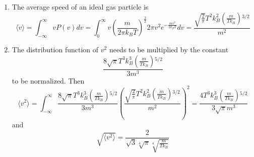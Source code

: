 \documentclass[fleqn]{article}[12pt]
\begin{document}
\begin{enumerate}
\begin{enumerate}
        \item
        The average speed of an ideal gas particle is
        \begin{equation*}
            \langle v \rangle = \int_{-\infty}^{\infty} v P(v) dv =
            \int_{0}^{\infty} v \left(\frac{m}{2\pi k_B T}\right)^{\frac{3}{2}} 2 \pi v^2 e^{-\frac{mv^2}{2k_BT}} dv =
            \frac{\sqrt{\frac{2}{\pi }} T^2 k_B^2 \left(\frac{m}{T k_B}\right){}^{3/2}}{m^2}
        \end{equation*}

        \item The distribution function of $v^2$ needs to be multiplied by the constant
        \begin{equation*}
            \frac{8 \sqrt{\pi } T^3 k_B^3 \left(\frac{m}{T k_B}\right){}^{5/2}}{3 m^3}
        \end{equation*}
        to be normalized. Then
        \begin{equation*}
            \langle v^2 \rangle = \int_{-\infty}^{\infty} \frac{8 \sqrt{\pi } T^3 k_B^3 \left(\frac{m}{T k_B}\right){}^{5/2}}{3 m^3} \left(\frac{\sqrt{\frac{2}{\pi }} T^2 k_B^2 \left(\frac{m}{T k_B}\right){}^{3/2}}{m^2}\right)^2 =
            \frac{4 T^3 k_B^3 \left(\frac{m}{T k_B}\right){}^{5/2}}{3 \sqrt{\pi } m^3}
        \end{equation*}
        and
        \begin{equation*}
            \sqrt{\langle v^2 \rangle} = \frac{2}{\sqrt{3} \sqrt[4]{\pi } \sqrt[4]{\frac{m}{T k_B}}}
        \end{equation*}
    \end{enumerate}
\end{enumerate}
\end{document}
